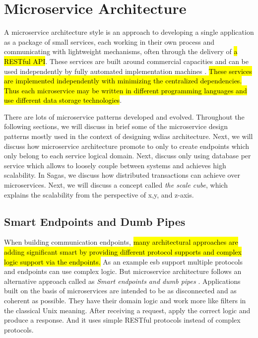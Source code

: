 \section{Microservice Architecture}
\label{se:microservice}

A microservice architecture style is an approach to developing a single application as a package of small services, each working in their own process and communicating with lightweight mechanisms, often through the delivery of \hl{a RESTful API}. These services are built around commercial capacities and can be used independently by fully automated implementation machines \cite{LewisMicroservices}. \hl{These services are implemented independently with minimizing the centralized dependencies. Thus each microservice may be written in different programming languages and use different data storage technologies}.

There are lots of microservice patterns developed and evolved. Throughout the following sections, we will discuss in brief some of the microservice design patterns mostly used in the context of designing \acrshort{wdias} architecture. Next, we will discuss how microservice architecture promote to only to create endpoints which only belong to each service logical domain. Next, discuss only using database per service which allows to loosely couple between systems and achieves high scalability. In Sagas, we discuss how distributed transactions can achieve over microservices. Next, we will discuss a concept called \emph{the scale cube}, which explains the scalability from the perspective of x,y, and z-axis.


\subsection{Smart Endpoints and Dumb Pipes}
\label{subse:dumb_pipes}

When building communication endpoints, \hl{many architectural approaches are adding significant smart by providing different protocol supports and complex logic support via the endpoints.} As an example \acrshort{esb} support multiple protocols and endpoints can use complex logic. But microservice architecture follows an alternative approach called as \emph{Smart endpoints and dumb pipes} \cite{LewisMicroservicesPipes}.
Applications built on the basis of microservices are intended to be as disconnected and as coherent as possible. They have their domain logic and work more like filters in the classical Unix meaning. After receiving a request, apply the correct logic and produce a response. And it uses simple RESTful protocols instead of complex protocols.

